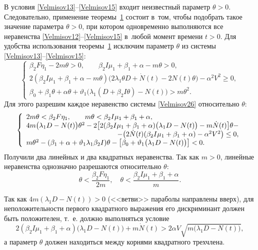 В условия \eqref{Velmisov13}--\eqref{Velmisov15} входит неизвестный параметр $\theta >0$. 
Следовательно, применение теоремы~\hyperlink{Velm:th1}{1} состоит в~том, чтобы подобрать такое значение параметра $\theta >0$, при котором одновременно выполняются все неравенства \eqref{Velmisov12}--\eqref{Velmisov15} в~любой момент времени $t>0$. 
Для удобства использования теоремы~\hyperlink{Velm:th1}{1} исключим параметр $\theta$ из системы \eqref{Velmisov13}--\eqref{Velmisov15}:
\begin{equation} \label{Velmisov26} 
\left\{\begin{array}{l}  
\beta _{2}F \eta _{1} -2m\theta > 0, \qquad 
\beta _{2}I \mu _{1} +\beta _{1} +\alpha-m\theta >0, \\ 
2(\beta _{2}I \mu _{1} +\beta _{1} +\alpha-m\theta )
\bigl(2\lambda _{1} \theta D+\dot{N}(t)-2N(t)\theta \bigr)-\alpha ^{2} V^{2} \ge 0, \\ 
\beta_{0}+\beta _{1} \theta +\alpha \theta +\vartheta _{1} \bigl(\lambda _{1} (D+\beta _{2} I\theta )-N(t)\bigr)>m\theta ^{2} .
\end{array}\right.  
\end{equation} 
Для этого разрешим каждое неравенство системы \eqref{Velmisov26} относительно $\theta $:
\begin{equation} \label{Velmisov27} 
\left\{\begin{array}{l} 
2m\theta < \beta _{2}F \eta _{1}, \qquad 
m\theta <\beta _{2}I \mu _{1} +\beta _{1} +\alpha, \\ 
4m \bigl(\lambda _{1}  D - N(t) \bigr)\theta^2 - 
2\bigl[2 (\beta _{2}I \mu _{1} + \beta _{1}  + \alpha ) \bigl(\lambda _{1}  D - N(t) \bigr) -
m\dot{N}(t)\bigr]\theta- \\
\hfill
-\bigl(2\dot{N}(t)(\beta _{2}I \mu _{1} +\beta _{1} +\alpha )-\alpha ^{2} V^{2} \bigr)\le 0, 
\\
m\theta ^{2}-(\beta _{1} +\alpha+\vartheta _{1}\lambda _{1} \beta _{2} I )\theta-
\bigl[\beta_{0}+\vartheta _{1} \bigl(\lambda _{1}D-N(t)\bigr)\bigr]<0 .
\end{array}\right.   
\end{equation}
Получили два линейных и два квадратных неравенства. Так как $m>0$,  линейные неравенства однозначно разрешаются относительно $\theta$: 
\[
\theta < \frac{\beta _{2}F \eta _{1}}{2m}, \quad \theta <\frac{\beta _{2}I \mu _{1} +\beta _{1} +\alpha }{m}.
\]

Так как $4m(\lambda _{1}  D-N(t))>0$ (<<ветви>> параболы направлены вверх), для неположительности  первого квадратного выражения его дискриминант должен быть положителен,  т.~е. должно выполняться условие
\begin{equation} 
\label{Velmisov27_1}
 2( \beta _{2}I \mu _{1} +\beta _{1} +\alpha )\bigl(\lambda _{1} D-N(t)\bigr)+m\dot{N}(t)>2\alpha V\sqrt{m\bigl(\lambda _{1} D-N(t)\bigr)},
 \end{equation}
а параметр $\theta$ должен находиться между корнями квадратного трехчлена.

